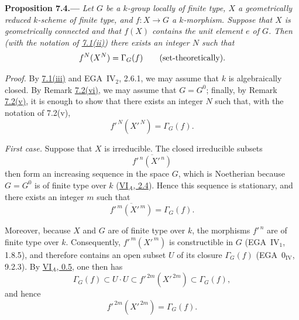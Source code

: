 
\medskip
{}\label{prop:sga3-VIB-7.4}%
\noindent\textbf{Proposition 7.4.---}
\emph{Let \(G\) be a \(k\)-group locally of finite type, \(X\)
a geometrically reduced \(k\)-scheme of finite type, and
\(f:X\to G\) a \(k\)-morphism. Suppose that \(X\) is
geometrically connected and that \(f(X)\) contains the unit
element \(e\) of \(G\). Then \textup{(}with the notation of
\hyperref[concl:sga3-VIB-7.1-ii]{7.1\textup{(ii)}}\textup{)} there
exists an integer \(N\) such that}
\label{form:sga3-VIB-7.4-stabilization}%
\[
  f^N(X^N)=\Gamma_G(f)
  \qquad\textup{(set-theoretically)}.
\]

\emph{Proof.}
By \hyperref[concl:sga3-VIB-7.1-iii]{7.1\textup{(iii)}} and
EGA~IV\(_2\), 2.6.1, we may assume that \(k\) is algebraically
closed. By Remark
\hyperref[rem:sga3-VIB-7.2-vi]{7.2\textup{(vi)}}, we may assume
that \(G=G^0\); finally, by Remark
\hyperref[rem:sga3-VIB-7.2-v]{7.2\textup{(v)}}, it is enough to
show that there exists an integer \(N\) such that, with the
notation of 7.2\textup{(v)},
\[
  f'^{\,N}(X'^{\,N})=\Gamma_G(f).
\]

\emph{First case.}
Suppose that \(X\) is irreducible. The closed irreducible
subsets
\[
  \overline{f'^{\,n}(X'^{\,n})}
\]
then form an increasing sequence in the space \(G\), which is
Noetherian because \(G=G^0\) is of finite type over \(k\)
(\hyperref[prop:sga3-VIA-2.4]{VI\(_A\), 2.4}). Hence this
sequence is stationary, and there exists an integer \(m\) such
that
\[
  \overline{f'^{\,m}(X'^{\,m})}=\Gamma_G(f).
\]

Moreover, because \(X\) and \(G\) are of finite type over
\(k\), the morphisms \(f'^{\,n}\) are of finite type over
\(k\). Consequently, \(f'^{\,m}(X'^{\,m})\) is constructible
in \(G\) (EGA~IV\(_1\), 1.8.5), and therefore contains an open
subset \(U\) of its closure \(\Gamma_G(f)\)
(EGA~0\(_{\mathrm{IV}}\), 9.2.3). By
\hyperref[sga3:VIA:0.5]{VI\(_A\), 0.5}, one then has
\label{form:sga3-VIB-7.4-first-case-chain}%
\[
  \Gamma_G(f)
  \subset U\cdot U
  \subset f'^{\,2m}(X'^{\,2m})
  \subset \Gamma_G(f),
\]
and hence
\[
  f'^{\,2m}(X'^{\,2m})=\Gamma_G(f).
\]

